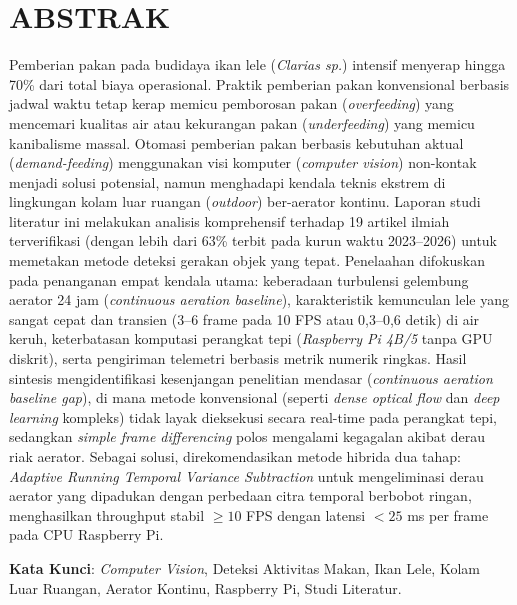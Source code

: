 \documentclass[12pt,a4paper]{article}
\begin{document}
\section*{ABSTRAK}
Pemberian pakan pada budidaya ikan lele (\textit{Clarias sp.}) intensif menyerap hingga 70\% dari total biaya operasional. Praktik pemberian pakan konvensional berbasis jadwal waktu tetap kerap memicu pemborosan pakan (\textit{overfeeding}) yang mencemari kualitas air atau kekurangan pakan (\textit{underfeeding}) yang memicu kanibalisme massal. Otomasi pemberian pakan berbasis kebutuhan aktual (\textit{demand-feeding}) menggunakan visi komputer (\textit{computer vision}) non-kontak menjadi solusi potensial, namun menghadapi kendala teknis ekstrem di lingkungan kolam luar ruangan (\textit{outdoor}) ber-aerator kontinu. Laporan studi literatur ini melakukan analisis komprehensif terhadap 19 artikel ilmiah terverifikasi (dengan lebih dari 63\% terbit pada kurun waktu 2023--2026) untuk memetakan metode deteksi gerakan objek yang tepat. Penelaahan difokuskan pada penanganan empat kendala utama: keberadaan turbulensi gelembung aerator 24 jam (\textit{continuous aeration baseline}), karakteristik kemunculan lele yang sangat cepat dan transien (3--6 frame pada 10 FPS atau 0,3--0,6 detik) di air keruh, keterbatasan komputasi perangkat tepi (\textit{Raspberry Pi 4B/5} tanpa GPU diskrit), serta pengiriman telemetri berbasis metrik numerik ringkas. Hasil sintesis mengidentifikasi kesenjangan penelitian mendasar (\textit{continuous aeration baseline gap}), di mana metode konvensional (seperti \textit{dense optical flow} dan \textit{deep learning} kompleks) tidak layak dieksekusi secara real-time pada perangkat tepi, sedangkan \textit{simple frame differencing} polos mengalami kegagalan akibat derau riak aerator. Sebagai solusi, direkomendasikan metode hibrida dua tahap: \textit{Adaptive Running Temporal Variance Subtraction} untuk mengeliminasi derau aerator yang dipadukan dengan perbedaan citra temporal berbobot ringan, menghasilkan throughput stabil $\ge 10$ FPS dengan latensi $<25$ ms per frame pada CPU Raspberry Pi.

\vspace{0.5cm}
\textbf{Kata Kunci}: \textit{Computer Vision}, Deteksi Aktivitas Makan, Ikan Lele, Kolam Luar Ruangan, Aerator Kontinu, Raspberry Pi, Studi Literatur.

\newpage

\tableofcontents
\newpage
\end{document}
